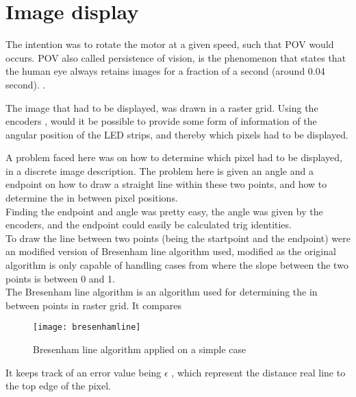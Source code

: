 \documentclass[10pt,a4paper]{article}
\begin{document}
\section{Image display}
The intention was to rotate the motor at a given speed, such that POV would occurs. POV also called persistence of vision, is the phenomenon that states that the human eye  
always retains images for a fraction of a second (around 0.04 second). . 

The image that had to be displayed, was drawn in a raster grid. Using the encoders , would it be  possible to provide some form of information of the angular position of the LED strips, and thereby which pixels had to be displayed. 


A problem faced here was on how to determine which pixel had to be displayed, in a discrete image description. The problem here is given an angle and a endpoint on how to draw a straight line within these two points, and how to determine the in between pixel positions. \\
Finding the endpoint and angle was pretty easy, the angle was given by the encoders, and the endpoint could easily be calculated trig identities. \\

To draw the line between two points (being the startpoint and the endpoint) were an modified version of Bresenham line algorithm used,  modified as the original algorithm is only capable of handling cases from where the slope between the two points is between 0 and 1. \\

The Bresenham line algorithm is an algorithm used for determining the in between points in raster grid.  It compares 

\begin{figure}[H]
\texttt{[image: bresenhamline]}
\caption{Bresenham line algorithm applied on a simple case}
\label{fig:bresenham_line}
\end{figure}
It keeps track of an error value being $\epsilon$ , which represent the distance real line to the top edge of the pixel. 
 



\end{document}
